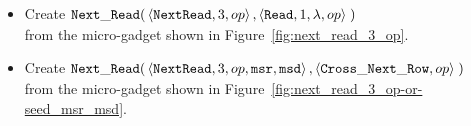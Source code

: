 \begin{itemize}
    \item Create
    $\begin{aligned}[t]
        {\tt Next\_Read}(& \left\langle {\tt NextRead}, 3,          op \right\rangle,
                    \left\langle {\tt Read},     1, \lambda, op \right\rangle \;)
    \end{aligned}$\\from the micro-gadget shown in Figure~\ref{fig:next_read_3_op}.

    \item Create
    $\begin{aligned}[t]
        {\tt Next\_Read}(& \left\langle {\tt NextRead}, 3,      op, {\tt msr}, {\tt msd} \right\rangle,
                    \left\langle {\tt Cross\_Next\_Row}, op \right\rangle \;)
    \end{aligned}$\\from the micro-gadget shown in Figure~\ref{fig:next_read_3_op-or-seed_msr_msd}.
\end{itemize}

